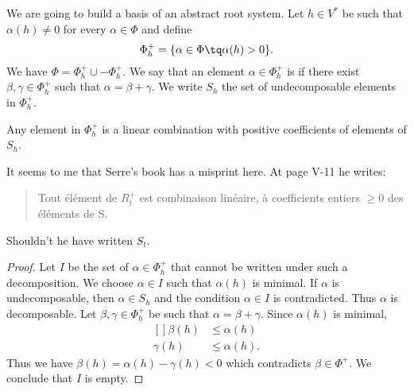 We are going to build a basis of an abstract root system. Let \( h\in V^*\) be such that \( \alpha(h)\neq 0\) for every  \( \alpha\in\Phi\) and define
\begin{equation}
    \Phi_h^+=\{ \alpha\in\Phi\tq \alpha(h)>0 \}.
\end{equation}
We have \( \Phi=\Phi^+_h\cup -\Phi_h^+\). We say that an element \( \alpha\in\Phi^+_h\) is  if there exist \( \beta,\gamma\in\Phi_h^+\) such that \( \alpha=\beta+\gamma\). We write \( S_h\) the set of undecomposable elements in \( \Phi^+_h\).

\begin{lemma}       \label{LemShPhihpCBLSh}
    Any element in \( \Phi^+_h\) is a linear combination with positive coefficients of elements of \( S_h\).
\end{lemma}

\begin{probleme}
    It seems to me that Serre's book\cite{SerreSSAlgebres} has a misprint here. At page V-11 he writes:
    \begin{quote}
        Tout élément de \( R^+_t\) est combinaison linéaire, à coefficients entiers \( \geq 0\) des éléments de S.
    \end{quote}
    Shouldn't he have written \( S_t\).
\end{probleme}

\begin{proof}
    Let \( I\) be the set of \( \alpha\in\Phi^+_h\) that cannot be written under such a decomposition. We choose \( \alpha\in I\) such that \( \alpha(h)\) is minimal. If \( \alpha\) is undecomposable, then \( \alpha\in S_h\) and the condition \( \alpha\in I\) is contradicted. Thus \( \alpha\) is decomposable. Let \( \beta,\gamma\in\Phi^+_h\) be such that \( \alpha=\beta+\gamma\). Since \( \alpha(h)\) is minimal,
    \begin{equation}
        \begin{aligned}[]
            \beta(h)&\leq \alpha(h)\\
            \gamma(h)&\leq \alpha(h).
        \end{aligned}
    \end{equation}
    Thus we have \( \beta(h)=\alpha(h)-\gamma(h)<0\) which contradicts \( \beta\in\Phi^+\). We conclude that \( I\) is empty.
\end{proof}

